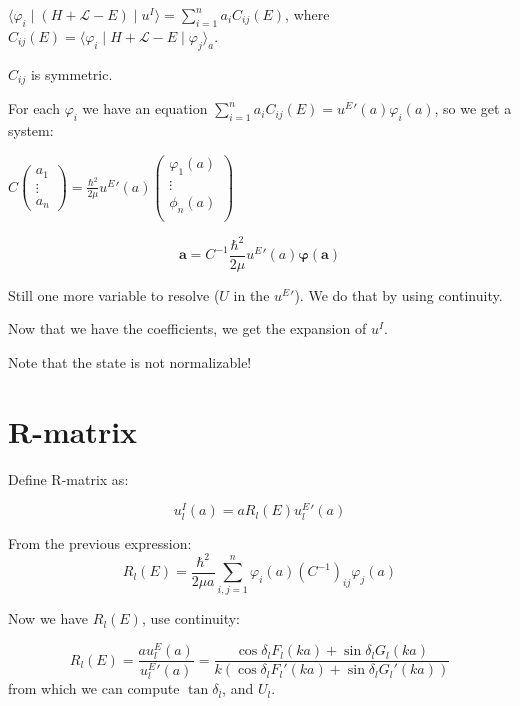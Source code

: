 \documentclass[12pt, a4paper]{article}
\begin{document}
$\langle \varphi_i \mid (H + \mathcal{L} - E) \mid u^I \rangle = \sum\limits_{i = 1}^n a_i C_{ij}(E)$, where $C_{ij}(E) = \langle \varphi_i \mid H + \mathcal{L} - E \mid \varphi_j \rangle_a$.

$C_{ij}$ is symmetric. 


For each $\varphi_i$ we have an equation $\sum\limits_{i = 1}^n a_i C_{ij}(E) = {u^E}'(a) \varphi_i(a)$, so we get a system:

$C \begin{pmatrix} a_1 \\ \vdots \\ a_n \end{pmatrix} = \frac{\hbar^2}{2 \mu} {u^E}'(a) \begin{pmatrix} \varphi_1(a) \\ \vdots \\ \phi_n(a) \\ \end{pmatrix}$

$$\boldsymbol{a} = C^{-1} \frac{\hbar^2}{2 \mu} {u^E}'(a) \boldsymbol{\varphi(a)}$$


Still one more variable to resolve ($U$ in the ${u^E}'$). We do that by using continuity.

Now that we have the coefficients, we get the expansion of $u^I$.

Note that the state is not normalizable!

\section{R-matrix}
Define R-matrix as:

$$u_l^I(a) = a R_l(E) {u_l^E}'(a)$$

From the previous expression:
$$R_l(E) = \frac{\hbar^2}{2 \mu a} \sum\limits_{i, j = 1}^n \varphi_i(a) (C^{-1})_{ij} \varphi_j(a)$$ 

Now we have $R_l(E)$, use continuity:

$$R_l(E) = \frac{a u^E_l(a)}{{u^E_l}'(a)} = \frac{\cos \delta_l F_l(ka) + \sin \delta_l G_l(ka)}{k (\cos \delta_l F_l'(ka) + \sin \delta_l G_l'(ka))}$$
from which we can compute $\tan \delta_l$, and $U_l$.
\end{document}
